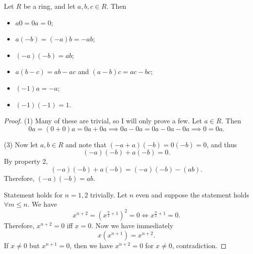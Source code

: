 \begin{proposition}\label{prp:1.1}
	Let $R$ be a ring, and let $a,b,c\in R$. Then
	\begin{itemize}
		\item $a0=0a=0$;
		\item $a(-b)=(-a)b=-ab$;
		\item $(-a)(-b)=ab$;
		\item $a(b-c)=ab-ac$ and $(a-b)c=ac-bc$;
		\item $(-1)a=-a$;
		\item $(-1)(-1)=1$.
	\end{itemize}
\end{proposition}
\begin{proof}
	(1) Many of these are trivial, so I will only prove a few. Let $a\in R$. Then
	\[
		0a=(0+0)a =0a+0a \implies 0a - 0a = 0a - 0a - 0a \implies 0=0a
	.\]


	(3) Now let $a,b\in R$ and note that $(-a+a)(-b)=0(-b)=0$, and thus
	\[
		(-a)(-b)+a(-b)=0
	.\]
	By property 2,
	\[
		(-a)(-b) + a(-b)=(-a)(-b)-(ab)
	.\]
	Therefore, $(-a)(-b)=ab$.

	Statement holds for $n=1,2$ trivially. Let $n$ even and suppose the statement holds $\forall m\leq n$. We have
	\[
		x^{n+2} = \left( x^{\frac{n}{2}+1} \right) ^2 = 0 \iff x^{\frac{n}{2}+1} = 0
	.\]
	Therefore, $x^{n+2}=0$ iff $x=0$. Now we have immediately
	\[
		x \left( x^{n+1} \right) =x^{n+2}
	.\]
	If $x\neq 0$ but $x^{n+1}=0$, then we have $x^{n+2}=0$ for $x\neq 0$, contradiction.
\end{proof}
